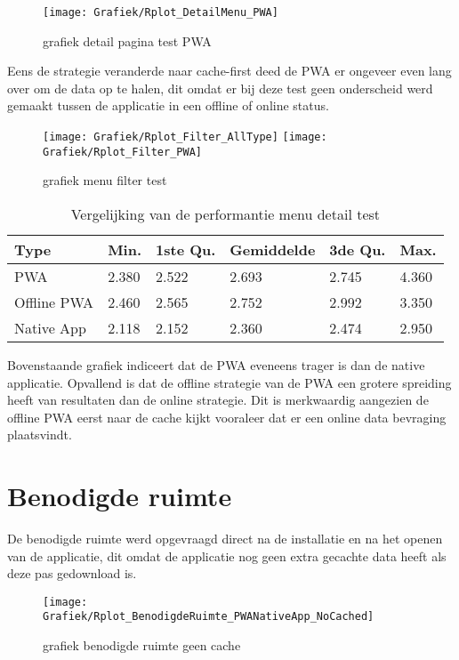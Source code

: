 \begin{figure}[H]
	\texttt{[image: Grafiek/Rplot\_DetailMenu\_PWA]}\centering
	\caption{grafiek detail pagina test PWA}
\end{figure}

Eens de strategie veranderde naar cache-first deed de PWA er ongeveer even lang over  om de data op te halen, dit omdat er bij deze test geen onderscheid werd gemaakt tussen de applicatie in een offline of online status.

\begin{figure}[H]
	\texttt{[image: Grafiek/Rplot\_Filter\_AllType]}\centering
	\texttt{[image: Grafiek/Rplot\_Filter\_PWA]}\centering
	\caption{grafiek menu filter test}
\end{figure}

\begin{table}[h!]
	\centering
	\begin{tabularx}{\textwidth }{|X|X|X|X|X|X|}
	\hline
		Type        & Min.  & 1ste Qu. & Gemiddelde & 3de Qu. & Max.  \\
	\hline
		PWA         & 2.380 & 2.522    & 2.693      & 2.745   & 4.360 \\
	\hline
		Offline PWA & 2.460 & 2.565    & 2.752      & 2.992   & 3.350 \\
	\hline
		Native App  & 2.118 & 2.152    & 2.360      & 2.474   & 2.950 \\
	\hline
	\end{tabularx}
	\label{table:2}
	\caption{Vergelijking van de performantie menu detail test}
\end{table}

Bovenstaande grafiek indiceert dat de PWA eveneens trager is dan de native applicatie. Opvallend is dat de offline strategie van de PWA een grotere spreiding heeft van resultaten dan de online strategie. Dit is merkwaardig aangezien de offline PWA eerst naar de cache kijkt vooraleer dat er een online data bevraging plaatsvindt.

\section{Benodigde ruimte}
De benodigde ruimte werd opgevraagd direct na de installatie en na het openen van de applicatie, dit omdat de applicatie nog geen extra gecachte data heeft als deze pas gedownload is. 

\begin{figure}[h]
	\texttt{[image: Grafiek/Rplot\_BenodigdeRuimte\_PWANativeApp\_NoCached]}\centering
	\caption{grafiek benodigde ruimte geen cache}
\end{figure}

